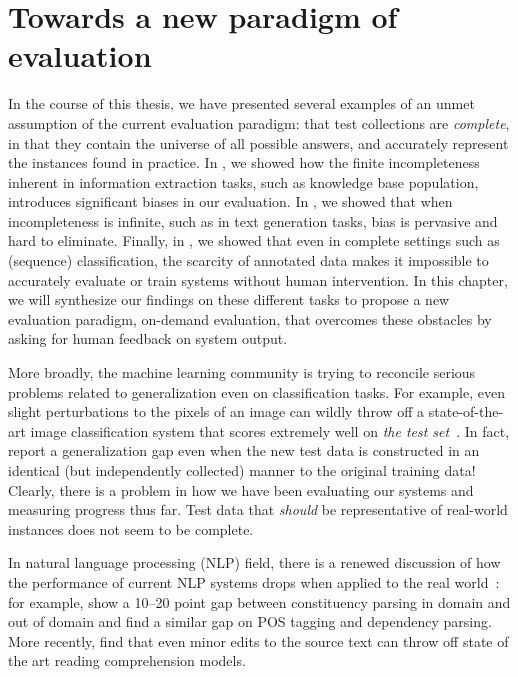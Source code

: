 \chapter[Towards a new paradigm of evaluation]{\label{chap:discussion} Towards a new paradigm of evaluation}

In the course of this thesis, we have presented several examples of an unmet assumption of the current evaluation paradigm: that test collections are \textit{complete}, in that they contain the universe of all possible answers, and accurately represent the instances found in practice.
In , we showed how the finite incompleteness inherent in information extraction tasks, such as knowledge base population, introduces significant biases in our evaluation.
In , we showed that when incompleteness is infinite, such as in text generation tasks, bias is pervasive and hard to eliminate.
Finally, in , we showed that even in complete settings such as (sequence) classification, the scarcity of annotated data makes it impossible to accurately evaluate or train systems without human intervention.
In this chapter, we will synthesize our findings on these different tasks to propose a new evaluation paradigm, on-demand evaluation, that overcomes these obstacles by asking for human feedback on system output.

More broadly, the machine learning community is trying to reconcile serious problems related to generalization even on classification tasks.
For example, even slight perturbations to the pixels of an image can wildly throw off a state-of-the-art image classification system that scores extremely well on \textit{the test set}~\citep{goodfellow2015explaining,carlini2016defensive,carlini2017adversarial}.
In fact, \citet{recht2018cifar} report a generalization gap even when the new test data is constructed in an identical (but independently collected) manner to the original training data!
Clearly, there is a problem in how we have been evaluating our systems and measuring progress thus far.
Test data that \textit{should} be representative of real-world instances does not seem to be complete.

In natural language processing (NLP) field,
  there is a renewed discussion of how the performance of current NLP systems drops when applied to the real world~\citet{plank16nonstandard}: 
for example, \citet{mcclosky2010any} show a 10--20 point gap between constituency parsing in domain and out of domain and \citet{foster2011news} find a similar gap on POS tagging and dependency parsing.
More recently, \citet{jia2017adversarial} find that even minor edits to the source text can throw off state of the art reading comprehension models.

